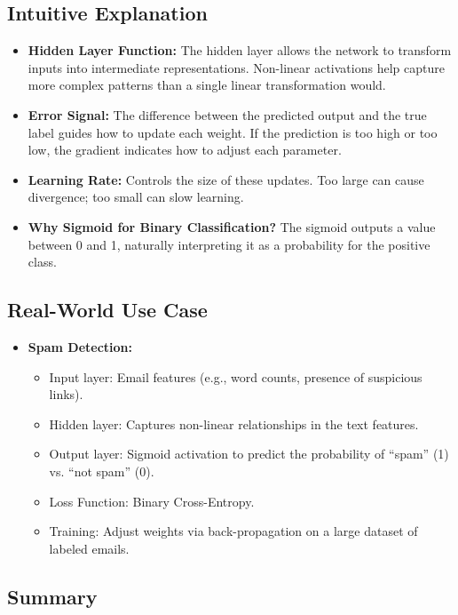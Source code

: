 \documentclass{article}
\begin{document}
\subsection{Intuitive Explanation}

\begin{itemize}
    \item \textbf{Hidden Layer Function:} The hidden layer allows the network to transform inputs into intermediate representations. Non-linear activations help capture more complex patterns than a single linear transformation would.
    \item \textbf{Error Signal:} The difference between the predicted output and the true label guides how to update each weight. If the prediction is too high or too low, the gradient indicates how to adjust each parameter.
    \item \textbf{Learning Rate:} Controls the size of these updates. Too large can cause divergence; too small can slow learning.
    \item \textbf{Why Sigmoid for Binary Classification?} The sigmoid outputs a value between 0 and 1, naturally interpreting it as a probability for the positive class. 
\end{itemize}

\subsection{Real-World Use Case}

\begin{itemize}
    \item \textbf{Spam Detection:} 
    \begin{itemize}
        \item Input layer: Email features (e.g., word counts, presence of suspicious links).
        \item Hidden layer: Captures non-linear relationships in the text features.
        \item Output layer: Sigmoid activation to predict the probability of ``spam'' (1) vs. ``not spam'' (0).
        \item Loss Function: Binary Cross-Entropy.
        \item Training: Adjust weights via back-propagation on a large dataset of labeled emails.
    \end{itemize}
\end{itemize}

\subsection{Summary}
\end{document}
